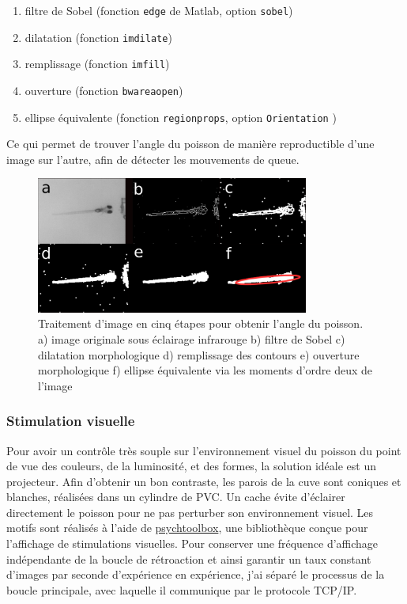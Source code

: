 \begin{enumerate} \itemsep0em
    \item filtre de Sobel (fonction \verb|edge| de Matlab, option \verb|sobel|)
    \item dilatation (fonction \verb|imdilate|)
    \item remplissage (fonction \verb|imfill|)
    \item ouverture (fonction \verb|bwareaopen|)
    \item ellipse équivalente (fonction \verb|regionprops|, option \verb|Orientation| )
\end{enumerate}

Ce qui permet de trouver l'angle du poisson de manière reproductible d'une image sur l'autre, afin de détecter les mouvements de queue.

\begin{figure}
    \centering
    \includegraphics[width=0.8\textwidth]{./files/image_process.png}
    \caption{Traitement d'image en cinq étapes pour obtenir l'angle du poisson. a) image originale sous éclairage infrarouge b) filtre de Sobel c) dilatation morphologique d) remplissage des contours e) ouverture morphologique f) ellipse équivalente via les moments d'ordre deux de l'image
    \label{FIGimageprocessing}}
    \end{figure}


\subsubsection{Stimulation visuelle}
Pour avoir un contrôle très souple sur l'environnement visuel du poisson du point de vue des couleurs, de la luminosité, et des formes, la solution idéale est un projecteur. Afin d'obtenir un bon contraste, les parois de la cuve sont coniques et blanches, réalisées dans un cylindre de PVC. Un cache évite d'éclairer directement le poisson pour ne pas perturber son environnement visuel. Les motifs sont réalisés à l'aide de \href{http://psychtoolbox.org/}{psychtoolbox}, une bibliothèque conçue pour l'affichage de stimulations visuelles. Pour conserver une fréquence d'affichage indépendante de la boucle de rétroaction et ainsi garantir un taux constant d'images par seconde d'expérience en expérience, j'ai séparé le processus de la boucle principale, avec laquelle il communique par le protocole TCP/IP.

